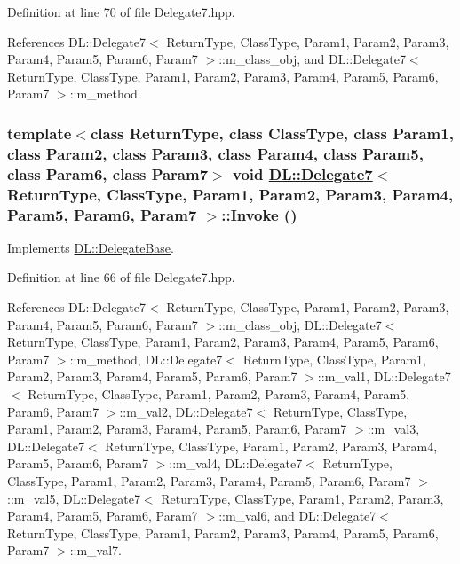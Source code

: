 Definition at line 70 of file Delegate7.hpp.

References DL::Delegate7$<$ Return\-Type, Class\-Type, Param1, Param2, Param3, Param4, Param5, Param6, Param7 $>$::m\_\-class\_\-obj, and DL::Delegate7$<$ Return\-Type, Class\-Type, Param1, Param2, Param3, Param4, Param5, Param6, Param7 $>$::m\_\-method.\hypertarget{classDL_1_1Delegate7_a2}{
\subsubsection[Invoke]{\setlength{\rightskip}{0pt plus 5cm}template$<$class Return\-Type, class Class\-Type, class Param1, class Param2, class Param3, class Param4, class Param5, class Param6, class Param7$>$ void \hyperlink{classDL_1_1Delegate7}{DL::Delegate7}$<$ Return\-Type, Class\-Type, Param1, Param2, Param3, Param4, Param5, Param6, Param7 $>$::Invoke ()}}
\label{classDL_1_1Delegate7_a2}




Implements \hyperlink{classDL_1_1DelegateBase_a2}{DL::Delegate\-Base}.

Definition at line 66 of file Delegate7.hpp.

References DL::Delegate7$<$ Return\-Type, Class\-Type, Param1, Param2, Param3, Param4, Param5, Param6, Param7 $>$::m\_\-class\_\-obj, DL::Delegate7$<$ Return\-Type, Class\-Type, Param1, Param2, Param3, Param4, Param5, Param6, Param7 $>$::m\_\-method, DL::Delegate7$<$ Return\-Type, Class\-Type, Param1, Param2, Param3, Param4, Param5, Param6, Param7 $>$::m\_\-val1, DL::Delegate7$<$ Return\-Type, Class\-Type, Param1, Param2, Param3, Param4, Param5, Param6, Param7 $>$::m\_\-val2, DL::Delegate7$<$ Return\-Type, Class\-Type, Param1, Param2, Param3, Param4, Param5, Param6, Param7 $>$::m\_\-val3, DL::Delegate7$<$ Return\-Type, Class\-Type, Param1, Param2, Param3, Param4, Param5, Param6, Param7 $>$::m\_\-val4, DL::Delegate7$<$ Return\-Type, Class\-Type, Param1, Param2, Param3, Param4, Param5, Param6, Param7 $>$::m\_\-val5, DL::Delegate7$<$ Return\-Type, Class\-Type, Param1, Param2, Param3, Param4, Param5, Param6, Param7 $>$::m\_\-val6, and DL::Delegate7$<$ Return\-Type, Class\-Type, Param1, Param2, Param3, Param4, Param5, Param6, Param7 $>$::m\_\-val7.

